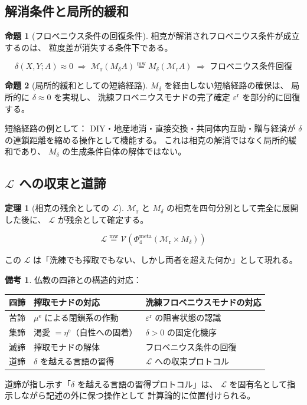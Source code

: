 \documentclass[11pt,a4paper]{article}
\theoremstyle{definition}
\newtheorem{theorem}{定理}[section]
\newtheorem{proposition}{命題}[section]
\newtheorem{remark}{備考}[section]
\newcommand{\mweq}{\mathrel{\overset{\mathrm{mw}}{=}}}
\newcommand{\Lhagma}{\mathcal{L}}
\newcommand{\Mr}{\mathcal{M}_{\mathrm{r}}}
\newcommand{\Md}{M_{\delta}}
\newcommand{\epsr}{\varepsilon^{\mathrm{r}}}
\newcommand{\etae}{\eta^{\mathrm{e}}}
\newcommand{\mue}{\mu^{\mathrm{e}}}
\begin{document}
\subsection{解消条件と局所的緩和}

\begin{proposition}[フロベニウス条件の回復条件]
相克が解消されフロベニウス条件が成立するのは、
粒度差が消失する条件下である。

\begin{equation}
\delta(X, Y; A) \approx 0 \;\Rightarrow\;
\Mr(\Md A) \mweq \Md(\Mr A) \;\Rightarrow\; \text{フロベニウス条件回復}
\end{equation}
\end{proposition}

\begin{proposition}[局所的緩和としての短絡経路]
$\Md$ を経由しない短絡経路の確保は、
局所的に $\delta \approx 0$ を実現し、
洗練フロベニウスモナドの完了確定 $\epsr$ を部分的に回復する。

短絡経路の例として：
DIY・地産地消・直接交換・共同体内互助・贈与経済が
$\delta$ の連鎖距離を縮める操作として機能する。
これは相克の解消ではなく局所的緩和であり、
$\Md$ の生成条件自体の解体ではない。
\end{proposition}

\subsection{$\Lhagma$ への収束と道諦}

\begin{theorem}[相克の残余としての $\Lhagma$]
$\Mr$ と $\Md$ の相克を四句分別として完全に展開した後に、
$\Lhagma$ が残余として確定する。

\begin{equation}
\Lhagma \mweq \mathcal{V}(\Phi_4^{\mathrm{meta}}(\Mr \times \Md))
\end{equation}

この $\Lhagma$ は「洗練でも搾取でもない、しかし両者を超えた何か」として現れる。
\end{theorem}

\begin{remark}
仏教の四諦との構造的対応：

\begin{center}
\begin{tabular}{lll}
\hline
\textbf{四諦} & \textbf{搾取モナドの対応} & \textbf{洗練フロベニウスモナドの対応} \\
\hline
苦諦 & $\mue$ による閉鎖系の作動 & $\epsr$ の阻害状態の認識 \\
集諦 & 渇愛 $= \etae$（自性への固着） & $\delta > 0$ の固定化機序 \\
滅諦 & 搾取モナドの解体 & フロベニウス条件の回復 \\
道諦 & $\delta$ を越える言語の習得 & $\Lhagma$ への収束プロトコル \\
\hline
\end{tabular}
\end{center}

道諦が指し示す「$\delta$ を越える言語の習得プロトコル」は、
$\Lhagma$ を固有名として指示しながら記述の外に保つ操作として
計算論的に位置付けられる。
\end{remark}
\end{document}
